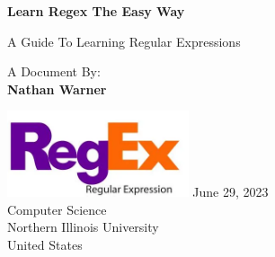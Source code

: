 \documentclass{report}
\title{\Huge{}}
\author{\huge{Nathan Warner}}
\date{\huge{}}
\begin{document}
        \begin{titlepage}
       \begin{center}
           \vspace*{1cm}
    
           \textbf{Learn Regex The Easy Way}
    
           \vspace{0.5cm}
           A Guide To Learning Regular Expressions
            
                
           \vspace{1.5cm}
    
           A Document By: \\
           \textbf{Nathan Warner}
    
           \vfill
                
                
           \vspace{0.8cm}
         
           \includegraphics[width=0.4\textwidth]{./figures/RegEx-Logo.png}
           \bigbreak \noindent 
            June 29, 2023 \\ 
           Computer Science \\
           Northern Illinois University\\
           United States\\
           
                
       \end{center}
    \end{titlepage}
    \tableofcontents
    \pagebreak \bigbreak \noindent
\end{document}

